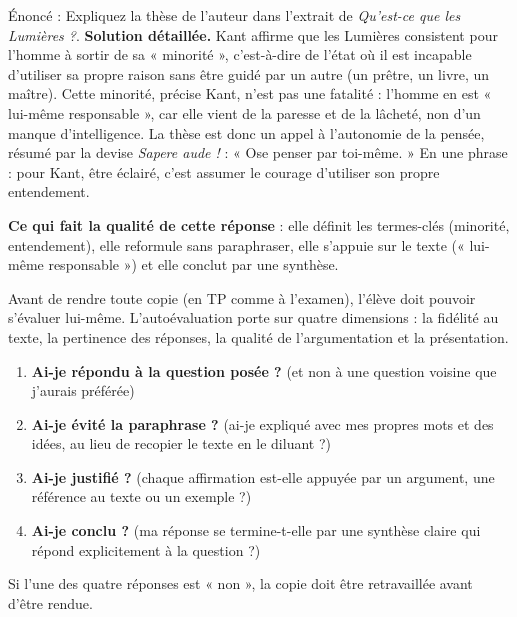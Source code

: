 \documentclass[11pt]{article}
\newcommand{\cle}[1]{{\popxbold\color{popdark}#1}}
\newcounter{popsec}
\newcounter{popsub}
\newcommand{\courssub}[1]{%
  \stepcounter{popsub}%
  \par\vspace{9pt}\noindent{\popxbold\fontsize{11.5}{13}\selectfont\color{popink}{\color{poporange}\thepopsec.\thepopsub}\hspace{6pt}#1}\par\nopagebreak\vspace{4pt}
}
\begin{document}
\begin{exoresolu}
Énoncé : Expliquez la thèse de l'auteur dans l'extrait de \emph{Qu'est-ce que les Lumières ?}.
\tcblower
\textbf{Solution détaillée.} Kant affirme que les Lumières consistent pour l'homme à sortir de sa « minorité », c'est-à-dire de l'état où il est incapable d'utiliser sa propre raison sans être guidé par un autre (un prêtre, un livre, un maître). Cette minorité, précise Kant, n'est pas une fatalité : l'homme en est « lui-même responsable », car elle vient de la paresse et de la lâcheté, non d'un manque d'intelligence. La thèse est donc un appel à l'autonomie de la pensée, résumé par la devise \emph{Sapere aude !} : « Ose penser par toi-même. » En une phrase : pour Kant, être éclairé, c'est assumer le courage d'utiliser son propre entendement.
\par \textbf{Ce qui fait la qualité de cette réponse} : elle définit les termes-clés (minorité, entendement), elle reformule sans paraphraser, elle s'appuie sur le texte (« lui-même responsable ») et elle conclut par une synthèse.
\end{exoresolu}

\courssub{Grille d'autoévaluation}

Avant de rendre toute copie (en TP comme à l'examen), l'élève doit pouvoir s'évaluer lui-même. L'autoévaluation porte sur quatre dimensions : la \cle{fidélité au texte}, la \cle{pertinence des réponses}, la \cle{qualité de l'argumentation} et la \cle{présentation}.

\begin{methode}
\begin{enumerate}
\item \textbf{Ai-je répondu à la question posée ?} (et non à une question voisine que j'aurais préférée)
\item \textbf{Ai-je évité la paraphrase ?} (ai-je expliqué avec mes propres mots et des idées, au lieu de recopier le texte en le diluant ?)
\item \textbf{Ai-je justifié ?} (chaque affirmation est-elle appuyée par un argument, une référence au texte ou un exemple ?)
\item \textbf{Ai-je conclu ?} (ma réponse se termine-t-elle par une synthèse claire qui répond explicitement à la question ?)
\end{enumerate}
Si l'une des quatre réponses est « non », la copie doit être retravaillée avant d'être rendue.
\end{methode}
\end{document}
